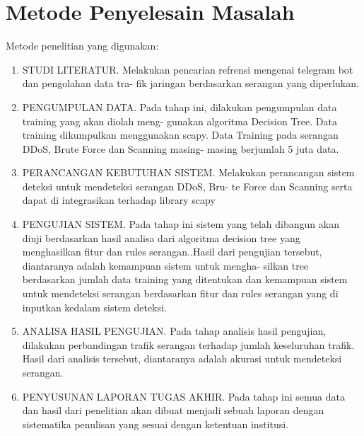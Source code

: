 \section{Metode Penyelesain Masalah}

Metode penelitian yang digunakan:
\begin{enumerate}

\item  STUDI LITERATUR. \newline
Melakukan pencarian refrensi mengenai telegram bot dan pengolahan data tra-
fik jaringan berdasarkan serangan yang diperlukan.

\item PENGUMPULAN DATA. \newline
Pada tahap ini, dilakukan pengumpulan data training yang akan diolah meng-
gunakan algoritma Decision Tree. Data training dikumpulkan menggunakan
scapy. Data Training pada serangan DDoS, Brute Force dan Scanning masing-
masing berjumlah 5 juta data.

\item PERANCANGAN KEBUTUHAN SISTEM. \newline
Melakukan perancangan sistem deteksi untuk mendeteksi serangan DDoS, Bru-
te Force dan Scanning serta dapat di integrasikan terhadap library scapy


\item PENGUJIAN SISTEM. \newline
Pada tahap ini sistem yang telah dibangun akan diuji berdasarkan hasil analisa
dari algoritma decision tree yang menghasilkan fitur dan rules serangan..Hasil
dari pengujian tersebut, diantaranya adalah kemampuan sistem untuk mengha-
silkan tree berdasarkan jumlah data training yang ditentukan dan kemampuan
sistem untuk mendeteksi serangan berdasarkan fitur dan rules serangan yang di
inputkan kedalam sistem deteksi.

\item ANALISA HASIL PENGUJIAN. \newline
Pada tahap analisis hasil pengujian, dilakukan perbandingan trafik serangan
terhadap jumlah keseluruhan trafik. Hasil dari analisis tersebut, diantaranya
adalah akurasi untuk mendeteksi serangan.

\item PENYUSUNAN LAPORAN TUGAS AKHIR. \newline
Pada tahap ini semua data dan hasil dari penelitian akan dibuat menjadi sebuah
laporan dengan sistematika penulisan yang sesuai dengan ketentuan institusi.

\end{enumerate}
\newpage
